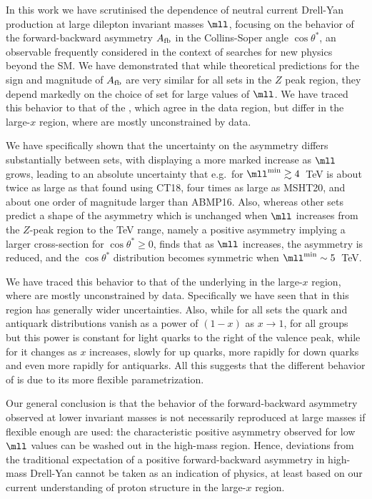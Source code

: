 
In this work we have scrutinised the \pdf dependence of  neutral current
Drell-Yan production
at large dilepton invariant masses $\mll$, focusing on the behavior
of the forward-backward asymmetry $A_{\rm fb}$
in the Collins-Soper angle $\cos\theta^*$, an observable frequently
considered in the context of searches for new physics beyond the SM.
%
We have demonstrated that while theoretical
predictions for the sign and magnitude of $A_{\rm fb}$ are very
similar for all \pdf sets in the
$Z$ peak region, they
depend markedly on the choice of \pdf set for  large values of $\mll$. 
We have traced this behavior to that of the \pdfs, which agree in the
data region, but differ in the large-$x$
region, where \pdfs are mostly unconstrained by data.

We have specifically shown that the uncertainty on the asymmetry
differs substantially between \pdf sets, with  displaying
a more marked increase as  $\mll$ grows, leading to
an absolute uncertainty that e.g.\ for $\mll^{\rm min}\gtrsim4$~TeV
is about twice as large as that found using CT18, 
four times as large as MSHT20,
and about one order of magnitude larger than ABMP16.
%
Also, whereas other \pdf sets predict a shape of the asymmetry
which is unchanged when  $\mll$ increases from the $Z$-peak region to
the TeV range, namely a 
positive
asymmetry implying a larger cross-section  for $\cos\theta^*\ge 0$,  finds that as
$\mll$ increases, the asymmetry is reduced, and the $\cos\theta^*$ distribution
becomes symmetric when $\mll^{\rm min}\sim5$~TeV.

We have traced this behavior to that of the underlying
\pdfs in the large-$x$ region, where \pdfs are mostly unconstrained by
data.
%
Specifically we have seen that in this region  has
generally wider uncertainties.
%
Also, while for  all \pdf  sets the
quark and antiquark distributions vanish as
a power of $(1-x)$ as $x\to 1$, for all groups but  this power is
constant for light quarks to the right of the valence peak, while for
 it changes as $x$ increases, slowly for up quarks, more rapidly
for down quarks and even more rapidly for antiquarks.
%
All this suggests that the different behavior of
 is due to its more flexible \pdf parametrization.

Our general conclusion is that the 
behavior of the forward-backward asymmetry
observed at lower invariant masses is not necessarily reproduced at
large masses if flexible enough
\pdfs are used:  the characteristic positive asymmetry observed
for low $\mll$ values
can be washed out in the high-mass region.
%
Hence, deviations from the traditional expectation of a positive forward-backward
asymmetry in high-mass Drell-Yan cannot be taken as an indication of 
\bsm physics,
at least based on  our current understanding of proton structure in the large-$x$ region.

